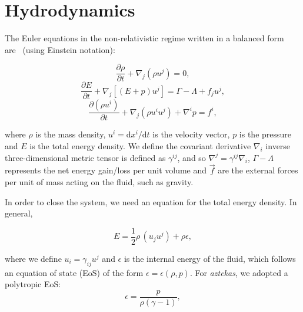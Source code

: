 \section{Hydrodynamics}
\label{sec:HD}

The Euler equations in the non-relativistic regime written in a balanced
form are~\citep[see][]{landau1987} (using Einstein notation):

\begin{equation}
    \frac{\partial \rho}{\partial t} + \nabla_j \left( \rho u^j \right) = 0,
\end{equation}
\begin{equation}
    \frac{\partial E}{\partial t} + \nabla_j \left[ (E + p) u^j \right] = \Gamma
    - \Lambda + f_j u^j,
\end{equation} 
\begin{equation}
    \frac{\partial \left( \rho u^i \right)}{\partial t} + \nabla_j \left( \rho
    u^i u^j \right) + \nabla^i p = f^i,
\end{equation} 

\noindent where $\rho$ is the mass density, $u^i = \mathrm{d}x^i/\mathrm{d}t$ is
the velocity vector, $p$ is the pressure and $E$ is the total energy density.
We define the covariant derivative $\nabla_i$
inverse three-dimensional metric tensor is defined as
$\gamma^{ij}$, and so $\nabla^j = \gamma^{ij} \nabla_i$, $\Gamma -
\Lambda$ represents the net energy gain/loss per unit volume and $\vec{f}$
are the external forces per unit of mass acting on the fluid, such as gravity.

In order to close the system, we need an equation for the total energy
density. In general,

\begin{equation}
    E = \frac{1}{2}\rho\, (u_j u^j) + \rho \epsilon,
\end{equation}

\noindent where we define $u_i = \gamma_{ij}u^j$ and $\epsilon$ is the internal energy of
the fluid, which follows an equation of state (EoS) of the form $\epsilon =
\epsilon(\rho,p)$. For \textit{aztekas}, we adopted a polytropic EoS:
\begin{equation}
    \epsilon = \frac{p}{\rho (\gamma - 1)},
\end{equation}

